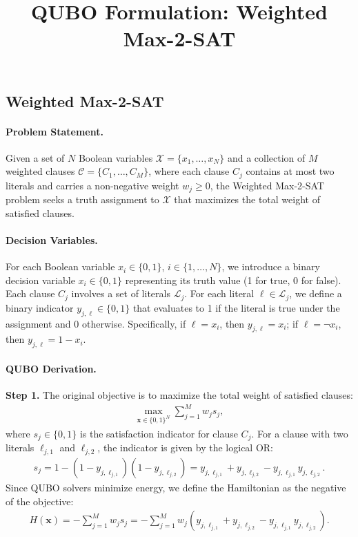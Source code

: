 \documentclass[12pt]{article}
\title{QUBO Formulation: Weighted Max-2-SAT}
\date{}
\begin{document}
\maketitle

\subsection*{Weighted Max-2-SAT}

\paragraph{Problem Statement.}
Given a set of $N$ Boolean variables $\mathcal{X} = \{x_1, \dots, x_N\}$ and a collection of $M$ weighted clauses $\mathcal{C} = \{C_1, \dots, C_M\}$, where each clause $C_j$ contains at most two literals and carries a non-negative weight $w_j \geq 0$, the Weighted Max-2-SAT problem seeks a truth assignment to $\mathcal{X}$ that maximizes the total weight of satisfied clauses.

\paragraph{Decision Variables.}
For each Boolean variable $x_i \in \{0,1\}$, $i \in \{1, \dots, N\}$, we introduce a binary decision variable $x_i \in \{0,1\}$ representing its truth value (1 for true, 0 for false). Each clause $C_j$ involves a set of literals $\mathcal{L}_j$. For each literal $\ell \in \mathcal{L}_j$, we define a binary indicator $y_{j,\ell} \in \{0,1\}$ that evaluates to 1 if the literal is true under the assignment and 0 otherwise. Specifically, if $\ell = x_i$, then $y_{j,\ell} = x_i$; if $\ell = \neg x_i$, then $y_{j,\ell} = 1 - x_i$.

\paragraph{QUBO Derivation.}
\textbf{Step 1.} The original objective is to maximize the total weight of satisfied clauses:
\begin{align}
    \max_{\mathbf{x} \in \{0,1\}^N} \sum_{j=1}^M w_j s_j,
\end{align}
where $s_j \in \{0,1\}$ is the satisfaction indicator for clause $C_j$. For a clause with two literals $\ell_{j,1}$ and $\ell_{j,2}$, the indicator is given by the logical OR:
\begin{align}
    s_j = 1 - (1 - y_{j,\ell_{j,1}})(1 - y_{j,\ell_{j,2}}) = y_{j,\ell_{j,1}} + y_{j,\ell_{j,2}} - y_{j,\ell_{j,1}}y_{j,\ell_{j,2}}.
\end{align}
Since QUBO solvers minimize energy, we define the Hamiltonian as the negative of the objective:
\begin{align}
    H(\mathbf{x}) = -\sum_{j=1}^M w_j s_j = -\sum_{j=1}^M w_j \left( y_{j,\ell_{j,1}} + y_{j,\ell_{j,2}} - y_{j,\ell_{j,1}}y_{j,\ell_{j,2}} \right).
\end{align}
\end{document}
